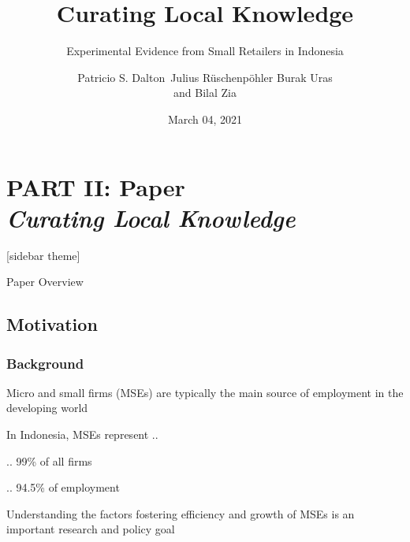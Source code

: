 \documentclass[hideothersubsections, usenames,dvipsnames,11pt]{beamer}
\newenvironment{itemize_2pt}{\itemize\addtolength{\itemsep}{2pt}}{\enditemize}
\begin{document}


\title[]{Curating Local Knowledge}
\subtitle{Experimental Evidence from Small Retailers in Indonesia}

\author[]
{Patricio S. Dalton\
Julius R{\"u}schenp{\"o}hler
Burak Uras\inst{1}\\and
Bilal Zia}


\date{March 04, 2021}


\section{\textbf{PART II: Paper} \\ \quad \emph{Curating Local Knowledge}}


\begin{frame}
\titlepage
\end{frame}


\setbeamertemplate{sidebar right}[sidebar theme]

\begin{frame}{Paper Overview}
\end{frame}


\subsection{Motivation}

\begin{frame}
\frametitle{Background}
	\begin{itemize_2pt}
	\item Micro and small firms (MSEs) are typically the main \textcolor{bdf}{source of employment} in the developing world
	\item In \textcolor{bdf}{Indonesia}, MSEs represent .. 
	\begin{itemize_2pt}
		\item .. 99\% of all firms
		\item .. 94.5\% of employment
	\end{itemize_2pt} 
	\item Understanding the factors fostering efficiency and growth of MSEs is an important research and policy goal
	\end{itemize_2pt}
\end{frame}
\end{document}

